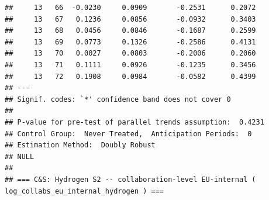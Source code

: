 \documentclass[
]{article}
\begin{document}
\begin{verbatim}
##     13   66  -0.0230     0.0909       -0.2531      0.2072 
##     13   67   0.1236     0.0856       -0.0932      0.3403 
##     13   68   0.0456     0.0846       -0.1687      0.2599 
##     13   69   0.0773     0.1326       -0.2586      0.4131 
##     13   70   0.0027     0.0803       -0.2006      0.2060 
##     13   71   0.1111     0.0926       -0.1235      0.3456 
##     13   72   0.1908     0.0984       -0.0582      0.4399 
## ---
## Signif. codes: `*' confidence band does not cover 0
## 
## P-value for pre-test of parallel trends assumption:  0.4231
## Control Group:  Never Treated,  Anticipation Periods:  0
## Estimation Method:  Doubly Robust
## NULL
## 
## === C&S: Hydrogen S2 -- collaboration-level EU-internal ( log_collabs_eu_internal_hydrogen ) ===
\end{verbatim}
\end{document}
